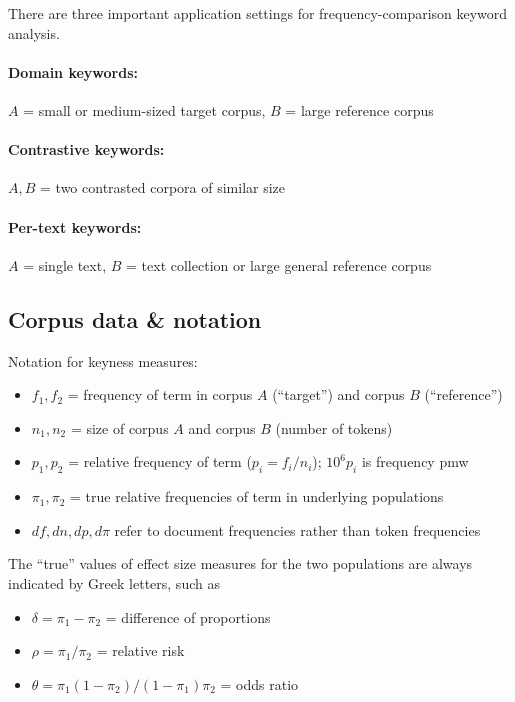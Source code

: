 \documentclass[a4paper]{article}
\begin{document}
There are three important application settings for frequency-comparison keyword analysis.

\paragraph{Domain keywords:} $A$ = small or medium-sized target corpus, $B$ = large reference corpus


\paragraph{Contrastive keywords:} $A, B$ = two contrasted corpora of similar size


\paragraph{Per-text  keywords:} $A$ = single text, $B$ = text collection or large general reference corpus


\subsection{Corpus data \& notation}
\label{sec:key:notation}

Notation for keyness measures:
\begin{itemize}
\item $f_1, f_2$ = frequency of term in corpus $A$ (``target'') and corpus $B$ (``reference'')
\item $n_1, n_2$ = size of corpus $A$ and corpus $B$ (number of tokens) 
\item $p_1, p_2$ = relative frequency of term ($p_i = f_i / n_i$); $10^6 p_i$ is frequency pmw
\item $\pi_1, \pi_2$ = true relative frequencies of term in underlying populations
\item $df, dn, dp, d\pi$ refer to document frequencies rather than token frequencies
\end{itemize}

The ``true'' values of effect size measures for the two populations are always indicated by Greek letters, such as
\begin{itemize}[nosep]
\item $\delta = \pi_1 - \pi_2$ = difference of proportions
\item $\rho = \pi_1 / \pi_2$ = relative risk
\item $\theta = \pi_1 (1 - \pi_2) / (1 - \pi_1) \pi_2$ = odds ratio  
\end{itemize}
\end{document}
